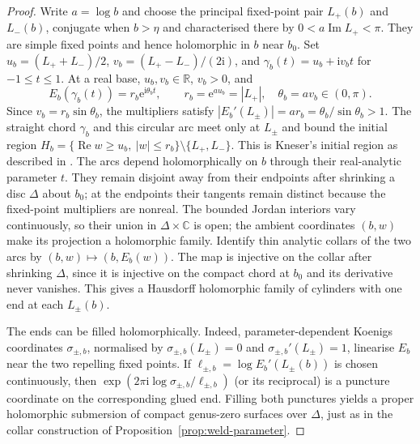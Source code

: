 \documentclass[11pt]{amsart}
\theoremstyle{definition}
\newcommand{\eee}{\mathrm{e}}
\newcommand{\ii}{\mathrm{i}}
\begin{document}
\begin{proof}
Write $a=\log b$ and choose the principal fixed-point pair $L_+(b)$ and
$L_-(b)$, conjugate when $b>\eta$ and characterised there by
$0<a\operatorname{Im}L_+<\pi$.  They are simple fixed
points and hence holomorphic in $b$ near $b_0$.  Set
$u_b=(L_++L_-)/2$, $v_b=(L_+-L_-)/(2\ii)$, and
$\gamma_b(t)=u_b+\ii v_b t$ for $-1\le t\le1$.
At a real base, $u_b,v_b\in\mathbb R$, $v_b>0$, and
\[
 E_b(\gamma_b(t))=r_b\eee^{\ii\theta_b t},\qquad
 r_b=\eee^{a u_b}=|L_+|,\quad
 \theta_b=a v_b\in(0,\pi).
\]
Since $v_b=r_b\sin\theta_b$, the multipliers satisfy
$|E_b'(L_\pm)|=a r_b=\theta_b/\sin\theta_b>1$.
The straight chord $\gamma_b$ and this circular arc meet only at
$L_\pm$ and bound the initial region
$H_b=\{\operatorname{Re}w\ge u_b,\ |w|\le r_b\}\setminus\{L_+,L_-\}$.
This is Kneser's initial region as described in
\cite[\S4, Lem.~4]{TrappmannKouznetsov2011}.
The arcs depend holomorphically on $b$ through their real-analytic
parameter $t$.  They remain disjoint away from their endpoints after
shrinking a disc $\Delta$ about $b_0$; at the endpoints their tangents
remain distinct because the fixed-point multipliers are nonreal.
The bounded Jordan interiors vary continuously, so their union in
$\Delta\times\mathbb C$ is open; the ambient coordinates $(b,w)$ make
its projection a holomorphic family.  Identify thin analytic collars
of the two arcs by
$(b,w)\mapsto(b,E_b(w))$.  The map is injective on the collar after
shrinking $\Delta$, since it is injective on the compact chord at
$b_0$ and its derivative never vanishes.  This gives a Hausdorff
holomorphic family of cylinders with one end at each $L_\pm(b)$.

The ends can be filled holomorphically.  Indeed, parameter-dependent
Koenigs coordinates $\sigma_{\pm,b}$, normalised by
$\sigma_{\pm,b}(L_\pm)=0$ and $\sigma_{\pm,b}'(L_\pm)=1$,
linearise $E_b$ near the two repelling fixed points.  If
$\ell_{\pm,b}=\log E_b'(L_\pm(b))$ is
chosen continuously, then
$\exp(2\pi\ii\log\sigma_{\pm,b}/\ell_{\pm,b})$ (or its reciprocal)
is a puncture coordinate on the corresponding glued end.  Filling
both punctures yields a proper holomorphic submersion of compact
genus-zero surfaces over $\Delta$, just as in the collar construction
of Proposition~\ref{prop:weld-parameter}.


\end{proof}
\end{document}
